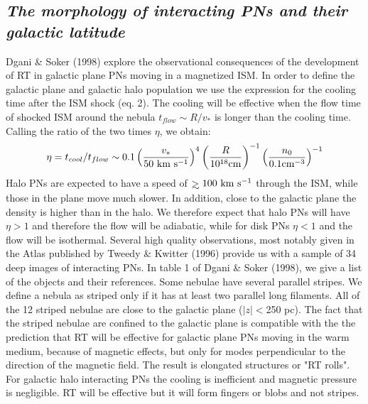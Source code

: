 \documentclass{article}
\def \cm{\rm{cm}}
\def \s{\rm{s}}
\def \km{\rm{km}}
\def \gae{\mathrel{>\kern-1.0em\lower0.9ex\hbox{$\sim$}}}
\def \cm{\rm{cm}}
\def \s{~\rm{s}}
\def \km{~\rm{km}}
\def \gae{\mathrel{>\kern-1.0em\lower0.9ex\hbox{$\sim$}}}
\begin{document}
\subsection{\it The morphology of interacting PNs and their galactic latitude}
Dgani \& Soker (1998) explore the observational consequences of the development
of RT in galactic plane PNs moving in a magnetized ISM.
In order to define the galactic plane and galactic halo population we
use the expression for the cooling time after the ISM shock (eq. 2).
The cooling will be effective when the flow time of shocked ISM around
the nebula $t_{flow}\sim  R/v_*$ is longer than the cooling time.
Calling the ratio of the two times $\eta$, we obtain:
\begin{eqnarray}
\eta=t_{cool}/t_{flow} \sim 0.1
\left( {{v_\ast}\over{50 \km \s^{-1}}} \right)^4
\left( {{R}\over{10^{18} \cm}} \right) ^{-1}
\left( {{n_0}\over{0.1 \cm^{-3}}} \right) ^{-1}
\end{eqnarray}
Halo PNs are expected to have a speed of $\gae 100 \km \s^{-1}$ through
the ISM, while those in the plane move much slower.
In addition, close to the galactic plane the density is higher
than in the halo.
We therefore expect that halo PNs will have $\eta > 1$ and therefore
the flow will be adiabatic, while for disk PNs
$\eta < 1$ and the flow will be isothermal.
Several high quality observations,
most notably given in the Atlas published by Tweedy \& Kwitter (1996)
provide us with a sample of 34  deep  images of interacting PNs.
In table 1 of Dgani \& Soker (1998),
we give a list of the objects and their references.
Some nebulae
have several parallel stripes.
We define a nebula as striped only
if it has at least two parallel long filaments.
All of the 12 striped nebulae  are close to the galactic plane ($|z|<$250 pc).
The fact that  the striped nebulae are confined to the galactic plane
is compatible with the the  prediction
that RT will be effective for
galactic plane PNs moving in the warm medium, because of
magnetic effects, but only for modes perpendicular
to the direction of the magnetic field.
The result is elongated structures or  "RT rolls".
For galactic  halo interacting PNs the cooling is
inefficient and magnetic pressure is negligible.
RT will be effective but it will form fingers or blobs and not stripes.
\end{document}
